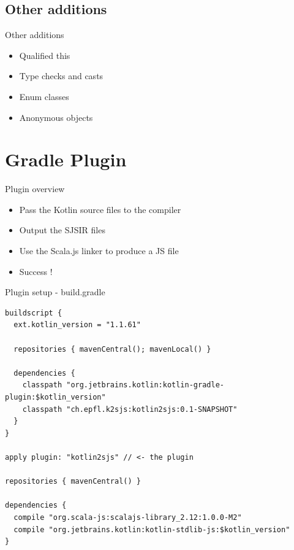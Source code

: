 \documentclass[10pt,usenames,dvipsnames]{beamer}
\begin{document}
\subsection{Other additions}

\begin{frame}{Other additions}
 \begin{itemize}
  \item Qualified this
  \item Type checks and casts
  \item Enum classes
  \item Anonymous objects
 \end{itemize}

\end{frame}


\section{Gradle Plugin}

\begin{frame}{Plugin overview}
 \begin{itemize}
  \item Pass the Kotlin source files to the compiler
  \item Output the SJSIR files
  \item Use the Scala.js linker to produce a JS file
  \item Success !
 \end{itemize}

\end{frame}


\begin{frame}[fragile]{Plugin setup - build.gradle}
\begin{verbatim}
buildscript {
  ext.kotlin_version = "1.1.61"
    
  repositories { mavenCentral(); mavenLocal() }

  dependencies {
    classpath "org.jetbrains.kotlin:kotlin-gradle-plugin:$kotlin_version"
    classpath "ch.epfl.k2sjs:kotlin2sjs:0.1-SNAPSHOT"
  }
}

apply plugin: "kotlin2sjs" // <- the plugin

repositories { mavenCentral() }

dependencies {  
  compile "org.scala-js:scalajs-library_2.12:1.0.0-M2"
  compile "org.jetbrains.kotlin:kotlin-stdlib-js:$kotlin_version"
}
\end{verbatim}
\end{frame}
\end{document}
